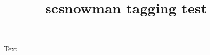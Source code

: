 \documentclass{article}
\title{scsnowman tagging test}
\begin{document}
Text
\scsnowman
\end{document}
